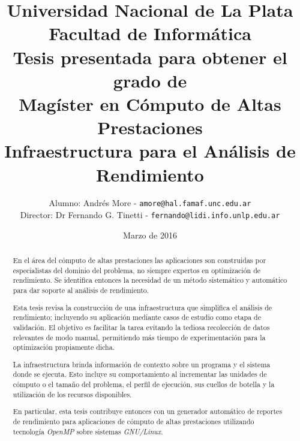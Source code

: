 \documentclass[a4paper]{report}
\begin{document}
\setlength{\parindent}{0cm}
\renewcommand{\tablename}{Tabla}

\title{Universidad Nacional de La Plata\\Facultad de Informática\\ \bigskip
{\large Tesis presentada para obtener el grado de \\}  Magíster en Cómputo de Altas Prestaciones\\ \bigskip
  Infraestructura para el Análisis de Rendimiento}

\author{
  Alumno: Andrés More - {\tt amore@hal.famaf.unc.edu.ar}\\
  Director: Dr Fernando G. Tinetti - {\tt fernando@lidi.info.unlp.edu.ar}
}

\date{Marzo de 2016}

\maketitle

\begin{abstract}

En el área del cómputo de altas prestaciones las aplicaciones son construidas por especialistas del dominio del problema, no siempre expertos en optimización de rendimiento. Se identifica entonces la necesidad de un método sistemático y automático para dar soporte al análisis de rendimiento.

\bigskip

Esta tesis revisa la construcción de una infraestructura que simplifica el análisis de rendimiento; incluyendo su aplicación mediante casos de estudio como etapa de validación. El objetivo es facilitar la tarea evitando la tediosa recolección de datos relevantes de modo manual, permitiendo más tiempo de experimentación para la optimización propiamente dicha.

\bigskip

La infraestructura brinda información de contexto sobre un programa y el sistema donde se ejecuta. Esto incluye su comportamiento al incrementar las unidades de cómputo o el tamaño del problema,
el perfil de ejecución, sus cuellos de botella y la utilización de los recursos disponibles.

\bigskip

En particular, esta tesis contribuye entonces con un generador automático de reportes de rendimiento para aplicaciones de cómputo de altas prestaciones utilizando tecnología {\it OpenMP} sobre sistemas {\it GNU/Linux}.

\end{abstract}
\end{document}
